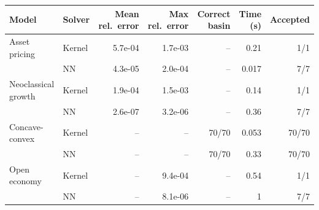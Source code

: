 \begin{tabular}{llrrrrr}
\toprule
Model & Solver & Mean rel.\ error & Max rel.\ error & Correct basin & Time (s) & Accepted \\
\midrule
Asset pricing & Kernel & 5.7e-04 & 1.7e-03 & -- & 0.21 & 1/1 \\
 & NN & 4.3e-05 & 2.0e-04 & -- & 0.017 & 7/7 \\
Neoclassical growth & Kernel & 1.9e-04 & 1.5e-03 & -- & 0.14 & 1/1 \\
 & NN & 2.6e-07 & 3.2e-06 & -- & 0.36 & 7/7 \\
Concave-convex & Kernel & -- & -- & 70/70 & 0.053 & 70/70 \\
 & NN & -- & -- & 70/70 & 0.33 & 70/70 \\
Open economy & Kernel & -- & 9.4e-04 & -- & 0.54 & 1/1 \\
 & NN & -- & 8.1e-06 & -- & 1 & 7/7 \\
\bottomrule
\end{tabular}

